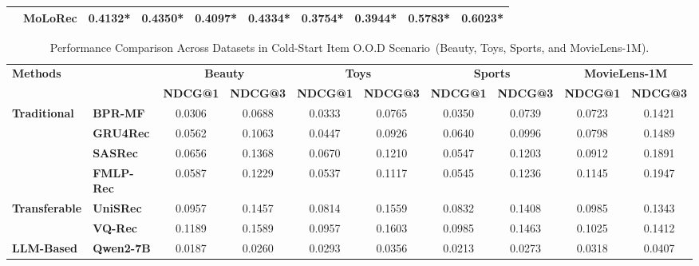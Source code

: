 \begin{table*}[h]
\begin{adjustbox}{max width=\textwidth}
\begin{tabular}{ll|cc|cc|cc||cc}
& \cellcolor[gray]{0.9}\textbf{MoLoRec} 
& \cellcolor[gray]{0.9}\textbf{0.4132*} 
& \cellcolor[gray]{0.9}\textbf{0.4350*} 
& \cellcolor[gray]{0.9}\textbf{0.4097*} 
& \cellcolor[gray]{0.9}\textbf{0.4334*} 
& \cellcolor[gray]{0.9}\textbf{0.3754*} 
& \cellcolor[gray]{0.9}\textbf{0.3944*} 
& \cellcolor[gray]{0.9} \textbf{0.5783*} 
& \cellcolor[gray]{0.9} \textbf{0.6023*}\\ 
\bottomrule
\end{tabular}
\end{adjustbox}
\label{table:performance_comparison}
\end{table*}



\begin{table*}[h]
\small
\centering
\caption{Performance Comparison Across Datasets in Cold-Start Item O.O.D Scenario~(Beauty, Toys, Sports, and MovieLens-1M).}
\begin{adjustbox}{max width=\textwidth}
\begin{tabular}{ll|cc|cc|cc||cc}
\toprule
\multirow{2}{*}{\textbf{Methods}} & \multirow{2}{*}{} & \multicolumn{2}{c|}{\textbf{Beauty}} & \multicolumn{2}{c|}{\textbf{Toys}} & \multicolumn{2}{c||}{\textbf{Sports}} & \multicolumn{2}{c}{\textbf{MovieLens-1M}} \\ 
 & & \textbf{NDCG@1} & \textbf{NDCG@3} & \textbf{NDCG@1} & \textbf{NDCG@3} & \textbf{NDCG@1} & \textbf{NDCG@3} & \textbf{NDCG@1} & \textbf{NDCG@3} \\ 
\midrule
\multirow{4}{*}{\textbf{Traditional}} 
& \textbf{BPR-MF} & 0.0306 & 0.0688 & 0.0333 & 0.0765 & 0.0350 & 0.0739 & 0.0723 & 0.1421 \\ 
& \textbf{GRU4Rec} & 0.0562 & 0.1063 & 0.0447 & 0.0926 & 0.0640 & 0.0996 & 0.0798 & 0.1489 \\ 
& \textbf{SASRec} & 0.0656 & 0.1368 & 0.0670 & 0.1210 & 0.0547 & 0.1203 & 0.0912 & 0.1891 \\ 
& \textbf{FMLP-Rec} & 0.0587 & 0.1229 & 0.0537 & 0.1117 & 0.0545 & 0.1236 & 0.1145 & 0.1947 \\ 
\midrule
\multirow{2}{*}{\textbf{Transferable}} 
& \textbf{UniSRec} & 0.0957 & 0.1457 & 0.0814 & 0.1559 & 0.0832 & 0.1408 & 0.0985 & 0.1343 \\ 
& \textbf{VQ-Rec} & 0.1189 & 0.1589 & 0.0957 & 0.1603 & 0.0985 & 0.1463 & 0.1025 & 0.1412\\ 
\midrule
\multirow{4}{*}{\textbf{LLM-Based}} 
& \textbf{Qwen2-7B} & 0.0187 & 0.0260 & 0.0293 & 0.0356 & 0.0213 & 0.0273 & 0.0318 & 0.0407 \\ 

\end{tabular}
\end{adjustbox}
\end{table*}
